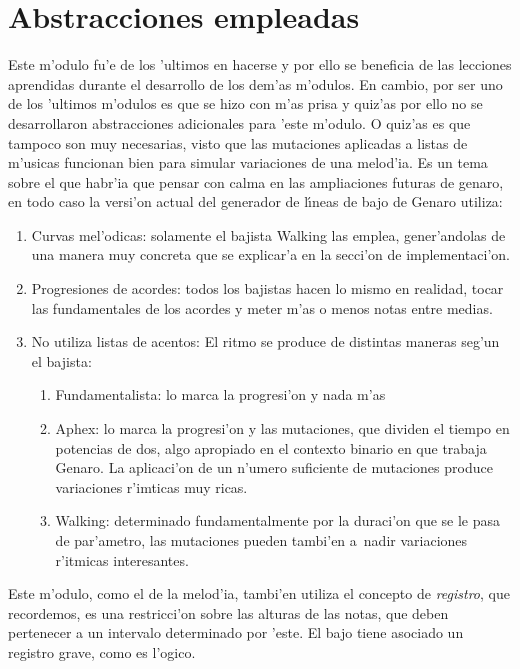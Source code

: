 \section{Abstracciones empleadas}
Este m'odulo fu'e de los 'ultimos en hacerse y por ello se beneficia de las lecciones aprendidas durante el desarrollo de los dem'as m'odulos. En cambio, por ser uno de los 'ultimos m'odulos es que se hizo con m'as prisa y quiz'as por ello no se desarrollaron abstracciones adicionales para 'este m'odulo. O quiz'as es que tampoco son muy necesarias, visto que las mutaciones aplicadas a listas de m'usicas funcionan bien para simular variaciones de una melod'ia. Es un tema sobre el que habr'ia que pensar con calma en las ampliaciones futuras de genaro, en todo caso la versi'on actual del generador de l\'\i neas de bajo de Genaro utiliza:
        \begin{enumerate}
        \item Curvas mel'odicas: solamente el bajista Walking las emplea, gener'andolas de una manera muy concreta que se explicar'a en la secci'on de implementaci'on.
        \item Progresiones de acordes: todos los bajistas hacen lo mismo en realidad, tocar las fundamentales de los acordes y meter m'as o menos notas entre medias.
        \item No utiliza listas de acentos: El ritmo se produce de distintas maneras seg'un el bajista:
                \begin{enumerate} 
                \item Fundamentalista: lo marca la progresi'on y nada m'as
                \item Aphex: lo marca la progresi'on y las mutaciones, que dividen el tiempo en potencias de dos, algo apropiado en el contexto binario en que trabaja Genaro. La aplicaci'on de un n'umero suficiente de mutaciones produce variaciones r'imticas muy ricas.
                \item Walking: determinado fundamentalmente por la duraci'on que se le pasa de par'ametro, las mutaciones pueden tambi'en a~nadir variaciones r'itmicas interesantes.
                \end{enumerate}
        \end{enumerate}

Este m'odulo, como el de la melod'ia, tambi'en utiliza el concepto de \emph{registro}, que recordemos, es una restricci'on sobre las alturas de las notas, que deben pertenecer a un intervalo determinado por 'este. El bajo tiene asociado un registro grave, como es l'ogico.


